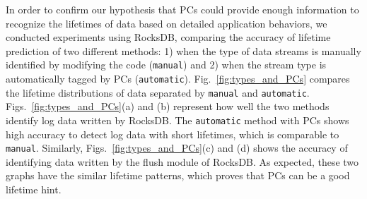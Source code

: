 In order to confirm our hypothesis that PCs could provide enough information to
recognize the lifetimes of data based on detailed application behaviors, we
conducted experiments using RocksDB, comparing the accuracy of lifetime
prediction of two different methods: 1) when the type of data streams is
manually identified by modifying the code (\texttt{manual}) and 2) when the
stream type is automatically tagged by PCs (\texttt{automatic}).
Fig.~\ref{fig:types_and_PCs} compares the lifetime distributions of data
separated by \texttt{manual} and \texttt{automatic}.
Figs.~\ref{fig:types_and_PCs}(a) and (b) represent how well the two methods
identify log data written by RocksDB. The \texttt{automatic} method with PCs
shows high accuracy to detect log data with short lifetimes, which is
comparable to \texttt{manual}. Similarly, Figs.~\ref{fig:types_and_PCs}(c) and
(d) shows the accuracy of identifying data written by the flush module of
RocksDB.  As expected, these two graphs have the similar lifetime patterns,
which proves that PCs can be a good lifetime hint.


